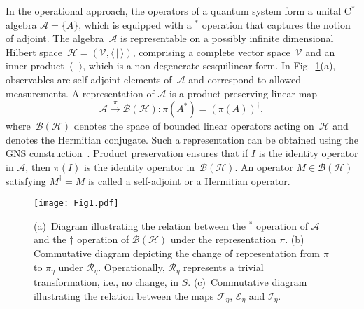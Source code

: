 \documentclass[amsmath,amssymb,aps,pra,superscriptaddress,twocolumn]{revtex4-2}
\begin{document}
In the operational approach, the operators of a quantum system form a unital C${}^*$ algebra
$\mathcal{A}=\{A\}$, which is equipped with a ${}^*$ operation that 
captures the notion of adjoint. The algebra~$\mathcal{A}$ is representable on a 
possibly infinite dimensional 
Hilbert space~$\mathscr H=(\mathscr{V},\langle\,\vert\,\rangle)$, 
comprising a complete vector space~$\mathscr V$
and an inner product~$\langle\,\vert\,\rangle$, which is a non-degenerate sesquilinear form.
In Fig.~\ref{fig:commutativediagram}(a),
observables are self-adjoint elements of~$\mathcal{A}$ and correspond to allowed measurements.
A representation of $\mathcal{A}$ is a product-preserving linear map 
\begin{equation}
\label{eq:pi*dagger}
\mathcal{A} \stackrel{\pi}{\to} \mathcal{B}(\mathscr{H}):
\pi(A^*) = (\pi(A))^\dagger,
\end{equation}
where~$\mathcal{B}(\mathscr H)$ denotes the space of bounded linear operators
acting on~$\mathscr H$ and $^\dagger$ denotes the Hermitian conjugate.
Such a representation can be obtained using the GNS construction~\cite{GN43,Seg47}.
Product preservation ensures that if $I$ is the identity operator in $\mathcal{A}$, then
$\pi(I)$ is the identity operator in~$\mathcal{B}(\mathscr H)$.
An operator $M\in \mathcal{B}(\mathscr H)$ satisfying $M^\dagger = M$ is called a self-adjoint or a Hermitian operator.
\begin{figure}
\begin{center}
\texttt{[image: Fig1.pdf]}
\end{center}
\caption{
(a)~Diagram illustrating the relation between the ${}^{*}$ operation of $\mathcal{A}$ and the 
$\dagger$ operation of $\mathcal{B}(\mathscr{H})$ under the representation $\pi$.
(b) Commutative diagram depicting the change of representation from $\pi$ to $\pi_{\eta}$ under $\mathcal{R}_\eta$. Operationally, 
$\mathcal{R}_\eta$ represents a trivial transformation, i.e., no change, in $S$. (c)~Commutative diagram illustrating the relation between 
the maps $\mathcal{F}_\eta$,
$\mathcal{E}_\eta$ and $\mathcal{I}_{\eta}$. }
\label{fig:commutativediagram}
\end{figure}
\end{document}
